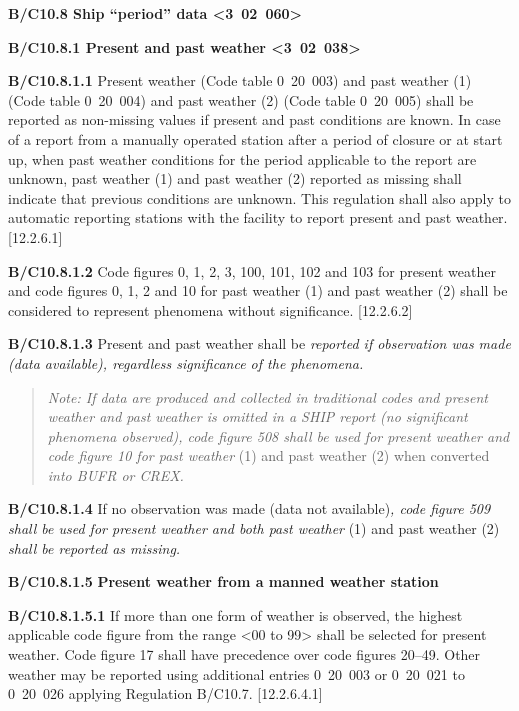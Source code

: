 \textbf{B/C10.8 Ship ``period'' data \textless3~02~060\textgreater{}}

\textbf{B/C10.8.1 Present and past weather \textless3~02~038\textgreater{}}

\textbf{B/C10.8.1.1} Present weather (Code table 0~20~003) and past weather (1) (Code table 0~20~004) and past weather (2) (Code table 0~20~005) shall be reported as non-missing values if present and past conditions are known. In case of a report from a manually operated station after a period of closure or at start up, when past weather conditions for the period applicable to the report are unknown, past weather (1) and past weather (2) reported as missing shall indicate that previous conditions are unknown. This regulation shall also apply to automatic reporting stations with the facility to report present and past weather. {[}12.2.6.1{]}

\textbf{B/C10.8.1.2} Code figures 0, 1, 2, 3, 100, 101, 102 and 103 for present weather and code figures 0, 1, 2 and 10 for past weather (1) and past weather (2) shall be considered to represent phenomena without significance. {[}12.2.6.2{]}

\textbf{B/C10.8.1.3} Present and past weather shall be \emph{reported if observation was made (data available), regardless significance of the phenomena.}

\begin{quote}
\emph{Note: If data are produced and collected in traditional codes and present weather and past weather is omitted in a SHIP report (no significant phenomena observed), code figure 508 shall be used for present weather and code figure 10 for past weather} (1) and past weather (2) when converted \emph{into BUFR or CREX.}
\end{quote}

\textbf{B/C10.8.1.4} If no observation was made (data not available)\emph{, code figure 509 shall be used for present weather and both past weather} (1) and past weather (2) \emph{shall be reported as missing.}

\textbf{B/C10.8.1.5} \textbf{Present weather from a manned weather station}

\textbf{B/C10.8.1.5.1} If more than one form of weather is observed, the highest applicable code figure from the range \textless00 to 99\textgreater{} shall be selected for present weather. Code figure 17 shall have precedence over code figures 20--49. Other weather may be reported using additional entries 0~20~003 or 0~20~021 to 0~20~026 applying Regulation B/C10.7. {[}12.2.6.4.1{]}

